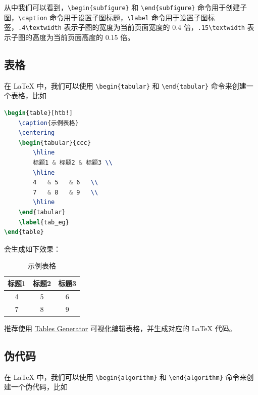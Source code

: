 从中我们可以看到，\texttt{\textbackslash begin\{subfigure\}} 和 \texttt{\textbackslash end\{subfigure\}} 命令用于创建子图，\texttt{\textbackslash caption} 命令用于设置子图标题，\texttt{\textbackslash label} 命令用于设置子图标签，\texttt{.4\textbackslash textwidth} 表示子图的宽度为当前页面宽度的 0.4 倍，\texttt{.15\textbackslash textwidth} 表示子图的高度为当前页面高度的 0.15 倍。

\subsection{表格}

在 LaTeX 中，我们可以使用 \texttt{\textbackslash begin\{tabular\}} 和 \texttt{\textbackslash end\{tabular\}} 命令来创建一个表格，比如

\begin{lstlisting}[language=TeX]
\begin{table}[htb!]
    \caption{示例表格}
    \centering
    \begin{tabular}{ccc}
        \hline
        标题1 & 标题2 & 标题3 \\
        \hline
        4   & 5   & 6   \\
        7   & 8   & 9   \\
        \hline
    \end{tabular}
    \label{tab_eg}
\end{table}
\end{lstlisting}

\noindent 会生成如下效果：

\begin{table}[htb!]
    \caption{示例表格}
    \centering
    \begin{tabular}{ccc}
        \hline
        标题1 & 标题2 & 标题3 \\
        \hline
        4   & 5   & 6   \\
        7   & 8   & 9   \\
        \hline
    \end{tabular}
    \label{tab_eg}
\end{table}

推荐使用 \href{https://www.tablesgenerator.com/}{Tables Generator} 可视化编辑表格，并生成对应的 LaTeX 代码。

\subsection{伪代码}

在 LaTeX 中，我们可以使用 \texttt{\textbackslash begin\{algorithm\}} 和 \texttt{\textbackslash end\{algorithm\}} 命令来创建一个伪代码，比如

